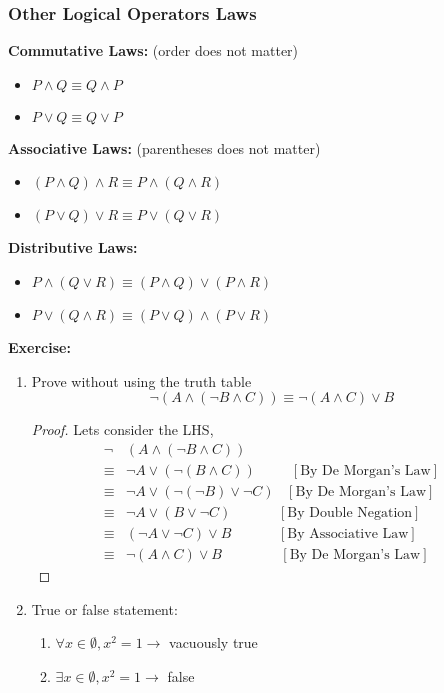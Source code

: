 \documentclass[10pt]{article}
\theoremstyle{break}
\begin{document}
\subsubsection{Other Logical Operators Laws}
\textbf{Commutative Laws:} (order does not matter)
\begin{itemize}
    \item $P \wedge Q \equiv Q \wedge P$
    \item $P \vee Q \equiv Q \vee P$
\end{itemize}
\textbf{Associative Laws:} (parentheses does not matter)
\begin{itemize}
    \item $(P \wedge Q) \wedge R \equiv P \wedge (Q \wedge R)$
    \item $(P \vee Q) \vee R \equiv P \vee (Q \vee R)$
\end{itemize}
\textbf{Distributive Laws:}
\begin{itemize}
    \item $P \wedge (Q \vee R) \equiv (P \wedge Q) \vee (P \wedge R)$
    \item $P \vee (Q \wedge R) \equiv (P \vee Q) \wedge (P \vee R)$
\end{itemize}
\textbf{Exercise:} 
\begin{enumerate}
    \item Prove without using the truth table $$\neg (A \wedge (\neg B \wedge C)) \equiv \neg (A \wedge C) \vee B$$
    \begin{proof}
        Lets consider the LHS, 
        \begin{align*}
            \neg &(A \wedge (\neg B \wedge C))\\
            \equiv &\neg A \vee (\neg (B \wedge C)) \; \; \; \; \; \; \; \; \;[\text{By De Morgan's Law}] \\
            \equiv &\neg A \vee (\neg (\neg B) \vee \neg C) \; \; \; [\text{By De Morgan's Law}]\\
            \equiv &\neg A \vee (B \vee \neg C) \; \; \; \; \; \; \; \; \; \; \; \;[\text{By Double Negation}]\\
            \equiv &(\neg A \vee \neg C) \vee B \; \; \; \; \; \; \; \; \; \; \; \;[\text{By Associative Law}]\\
            \equiv &\neg (A \wedge C) \vee B \; \; \; \; \; \; \; \; \; \; \; \;\; \; \;[\text{By De Morgan's Law}]
        \end{align*}
    \end{proof}
    \item True or false statement: 
    \begin{enumerate}
        \item $\forall x \in \emptyset, x^2 = 1 \to$ vacuously true
        \item $\exists x \in \emptyset, x^2 = 1 \to$ false
    \end{enumerate}
\end{enumerate}
\end{document}
